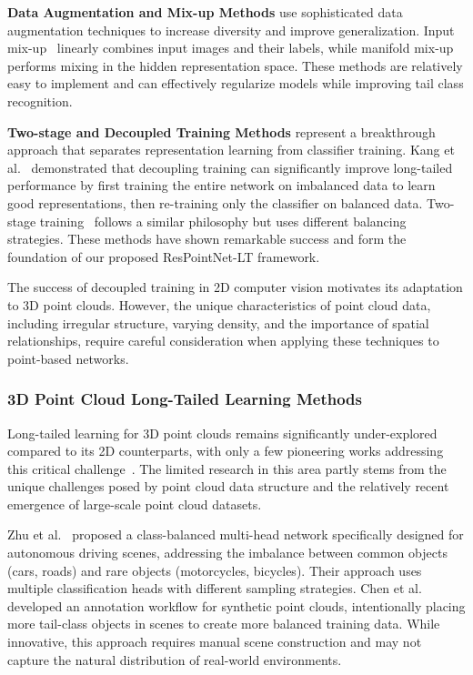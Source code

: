 \documentclass[preprint,12pt]{elsarticle}
\begin{document}
\textbf{Data Augmentation and Mix-up Methods} use sophisticated data augmentation techniques to increase diversity and improve generalization. Input mix-up~\cite{zhang2018mixup} linearly combines input images and their labels, while manifold mix-up~\cite{verma2019manifold} performs mixing in the hidden representation space. These methods are relatively easy to implement and can effectively regularize models while improving tail class recognition.

\textbf{Two-stage and Decoupled Training Methods} represent a breakthrough approach that separates representation learning from classifier training. Kang et al.~\cite{kang2020decoupling} demonstrated that decoupling training can significantly improve long-tailed performance by first training the entire network on imbalanced data to learn good representations, then re-training only the classifier on balanced data. Two-stage training~\cite{cao2019learning} follows a similar philosophy but uses different balancing strategies. These methods have shown remarkable success and form the foundation of our proposed ResPointNet-LT framework.

The success of decoupled training in 2D computer vision motivates its adaptation to 3D point clouds. However, the unique characteristics of point cloud data, including irregular structure, varying density, and the importance of spatial relationships, require careful consideration when applying these techniques to point-based networks.

\subsubsection{3D Point Cloud Long-Tailed Learning Methods}
Long-tailed learning for 3D point clouds remains significantly under-explored compared to its 2D counterparts, with only a few pioneering works addressing this critical challenge~\cite{zhu2019class, chen2022automatic, ding2022domain}. The limited research in this area partly stems from the unique challenges posed by point cloud data structure and the relatively recent emergence of large-scale point cloud datasets.

Zhu et al.~\cite{zhu2019class} proposed a class-balanced multi-head network specifically designed for autonomous driving scenes, addressing the imbalance between common objects (cars, roads) and rare objects (motorcycles, bicycles). Their approach uses multiple classification heads with different sampling strategies. Chen et al.~\cite{chen2022automatic} developed an annotation workflow for synthetic point clouds, intentionally placing more tail-class objects in scenes to create more balanced training data. While innovative, this approach requires manual scene construction and may not capture the natural distribution of real-world environments.
\end{document}
